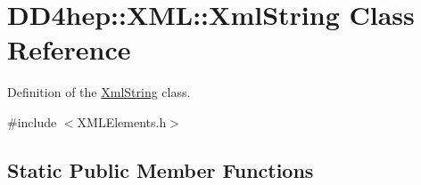 \hypertarget{class_d_d4hep_1_1_x_m_l_1_1_xml_string}{}\section{D\+D4hep\+:\+:X\+ML\+:\+:Xml\+String Class Reference}
\label{class_d_d4hep_1_1_x_m_l_1_1_xml_string}


Definition of the \hyperlink{class_d_d4hep_1_1_x_m_l_1_1_xml_string}{Xml\+String} class.  




{\ttfamily \#include $<$X\+M\+L\+Elements.\+h$>$}

\subsection*{Static Public Member Functions}
